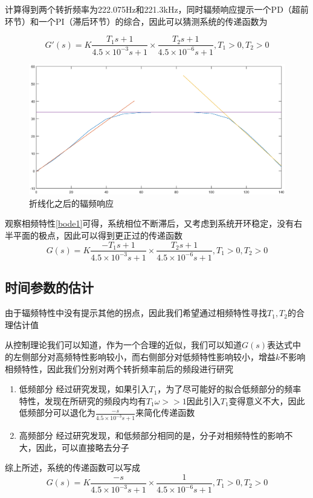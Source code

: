 \documentclass[UTF8,a4paper]{ctexart}
\begin{document}
计算得到两个转折频率为222.075Hz和221.3kHz，同时辐频响应提示一个PD（超前环节）和一个PI（滞后环节）的综合，因此可以猜测系统的传递函数为

\begin{equation}
G'(s)=K\frac{T_1s+1}{4.5\times10^{-3}s+1}\times\frac{T_2s+1}{4.5\times10^{-6}s+1}, T_1>0,T_2>0
\end{equation}
\begin{figure}
\includegraphics[width=\textwidth]{bode1.eps}
\caption{折线化之后的辐频响应}
\label{refin1}
\end{figure}
观察相频特性\ref{bode1}可得，系统相位不断滞后，又考虑到系统开环稳定，没有右半平面的极点，因此可以得到更正过的传递函数
\begin{equation}
G(s)=K\frac{-T_1s+1}{4.5\times10^{-3}s+1}\times\frac{T_2s+1}{4.5\times10^{-6}s+1}, T_1>0,T_2>0
\end{equation}
\subsection{时间参数的估计}
由于辐频特性中没有提示其他的拐点，因此我们希望通过相频特性寻找$T_1,T_2$的合理估计值

从控制理论我们可以知道，作为一个合理的近似，我们可以知道$G(s)$表达式中的左侧部分对高频特性影响较小，而右侧部分对低频特性影响较小，增益$k$不影响相频特性，因此我们分别对两个转折频率前后的频段进行研究

\begin{enumerate}
\item{低频部分}
经过研究发现，如果引入$T_1$，为了尽可能好的拟合低频部分的频率特性，发现在所研究的频段内均有$T_1\omega >> 1 $因此引入$T_1$变得意义不大，因此低频部分可以退化为$\frac{-s}{4.5\times10^{-3}s+1}$来简化传递函数
\item{高频部分}
经过研究发现，和低频部分相同的是，分子对相频特性的影响不大，因此，可以直接略去分子
\end{enumerate}
综上所述，系统的传递函数可以写成
\begin{equation}
G(s)=K\frac{-s}{4.5\times10^{-3}s+1}\times\frac{1}{4.5\times10^{-6}s+1}, T_1>0,T_2>0
\end{equation}
\end{document}

